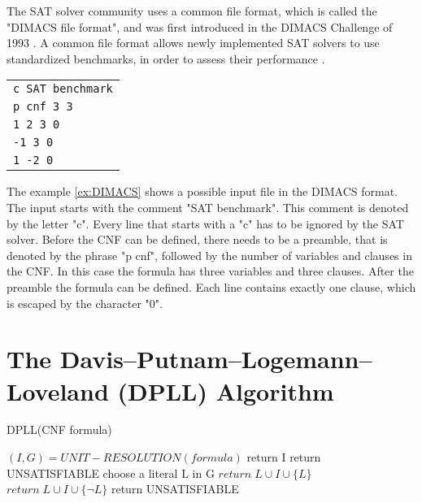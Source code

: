 The SAT solver community uses a common file format, which is called the "DIMACS file format", and was first introduced in the DIMACS Challenge of 1993 \cite{johnson1996cliques}. A common file format allows newly implemented SAT solvers to use standardized benchmarks, in order to assess their performance \cite{biere2009handbook}.

\begin{center}
\begin{leftbar}
\begin{tabular}{l}
\texttt{c SAT benchmark} \\
\texttt{p cnf 3 3} \\
\texttt{1 2 3 0} \\
\texttt{-1 3 0} \\
\texttt{1 -2 0}\\
\end{tabular}
\end{leftbar}
\label{ex:DIMACS}
\end{center}
The example \ref{ex:DIMACS} shows a possible input file in the DIMACS format. The input starts with the comment "SAT benchmark". This comment is denoted by the letter "c". Every line that starts with a "c" has to be ignored by the SAT solver. Before the CNF can be defined, there needs to be a preamble, that is denoted by the phrase "p cnf", followed by the number of variables and clauses in the CNF. In this case the formula has three variables and three clauses. After the preamble the formula can be defined. Each line contains exactly one clause, which is escaped by the character "0". \cite{biere2009handbook}

\section{The Davis–Putnam–Logemann–Loveland (DPLL) Algorithm}
\label{sec:dpll}

\begin{algorithm}
\caption{DPLL(CNF formula) \cite{biere2009handbook}}\label{alg:DPLL}
\begin{algorithmic}
\State $(I,G) = UNIT-RESOLUTION(formula)$
	\State return I
    \State return UNSATISFIABLE
\Else
	\State choose a literal L in G
		\State $return \; L \cup I \cup \{L\}$
		\State $return \; L \cup I \cup \{\neg L\}$
	\Else
		\State return UNSATISFIABLE
	\EndIf
\EndIf
\end{algorithmic}
\end{algorithm}



